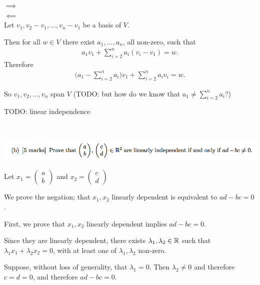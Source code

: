 \documentclass[12pt]{article}
\begin{document}
$\implies$\\


$\impliedby$\\
Let $v_1, v_2 - v_1, \ldots, v_n - v_1$ be a basis of $V$.

Then for all $w \in V$ there exist $a_1, \ldots, a_n$, all non-zero, such that
\begin{align*}
  a_1v_1 + \sum_{i=2}^n a_i(v_i - v_1) = w.
\end{align*}
Therefore
\begin{align*}
  \Big(a_1 - \sum_{i=2}^na_i\Big)v_1 + \sum_{i=2}^n a_iv_i = w.
\end{align*}

So $v_1, v_2, \ldots, v_n$ span $V$ (TODO: but how do we know that $a_1 \neq \sum_{i=2}^na_i$?)

TODO: linear independence

~\\
\newpage
\begin{mdframed}
\includegraphics[width=400pt]{img/oxford-prelims-2017-A-1-2.png}
\end{mdframed}

\renewcommand{\cvec}[2]{\begin{pmatrix}#1\\#2\end{pmatrix}}

Let $x_1 = \cvec{a}{b}$ and $x_2 = \cvec{c}{d}$

We prove the negation; that $x_1, x_2$ linearly dependent is equivalent to
$ad - bc = 0$.

First, we prove that $x_1, x_2$ linearly dependent implies $ad - bc = 0$.

Since they are linearly dependent, there exists $\lambda_1, \lambda_2 \in \mathbb{R}$
such that $\lambda_1x_1 + \lambda_2x_2 = 0$, with at least one of
$\lambda_1, \lambda_2$ non-zero.

Suppose, without loss of generality, that $\lambda_1 = 0$. Then
$\lambda_2 \neq 0$ and therefore $c = d = 0$, and therefore $ad - bc = 0$.
\end{document}
